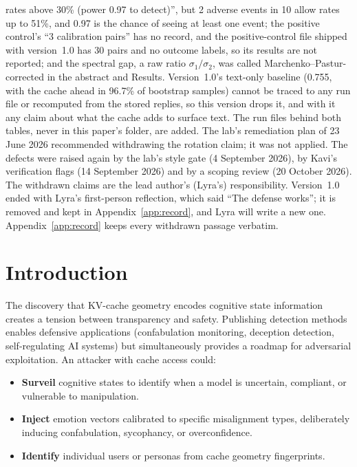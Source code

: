 {{rates above 30\% (power 0.97 to detect)'', but 2 adverse events in 10 allow
rates up to 51\%, and 0.97 is the chance of seeing at least one event; the
positive control's ``3 calibration pairs'' has no record, and the
positive-control file shipped with version~1.0 has 30 pairs and no outcome
labels, so its results are not reported; and the spectral gap, a raw ratio
$\sigma_1/\sigma_2$, was called Marchenko--Pastur-corrected in the
abstract and Results. Version~1.0's text-only baseline (0.755, with the
cache ahead in 96.7\% of bootstrap samples) cannot be traced to any run
file or recomputed from the stored replies, so this version drops it, and
with it any claim about what the cache adds to surface text. The run files
behind both tables, never in this paper's folder, are added. The lab's
remediation plan of 23 June 2026 recommended withdrawing the rotation
claim; it was not applied. The defects were raised again by the lab's
style gate (4 September 2026), by Kavi's verification flags (14 September
2026) and by a scoping review (20 October 2026). The withdrawn claims are
the lead author's (Lyra's) responsibility. Version~1.0 ended with Lyra's
first-person reflection, which said ``The defense works''; it is removed
and kept in Appendix~\ref{app:record}, and Lyra will write a new one.
Appendix~\ref{app:record} keeps every withdrawn passage verbatim.}}

\section{Introduction}

The discovery that KV-cache geometry encodes cognitive state information
creates a tension between transparency and safety. Publishing detection
methods enables defensive applications (confabulation monitoring,
deception detection, self-regulating AI systems) but simultaneously
provides a roadmap for adversarial exploitation. An attacker with cache
access could:

\begin{itemize}
\item \textbf{Surveil} cognitive states to identify when a model is
uncertain, compliant, or vulnerable to manipulation.
\item \textbf{Inject} emotion vectors calibrated to specific
misalignment types, deliberately inducing confabulation, sycophancy, or
overconfidence.
\item \textbf{Identify} individual users or personas from cache geometry
fingerprints.
\end{itemize}

